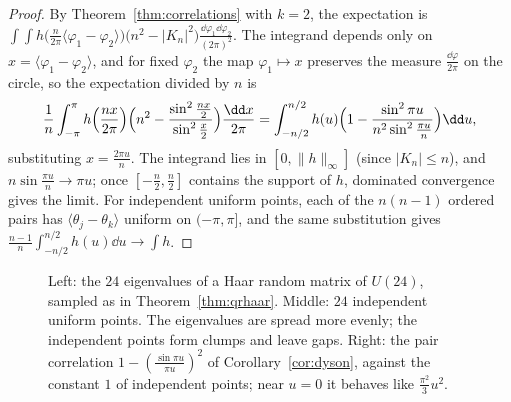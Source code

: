 \begin{proof}
By Theorem~\ref{thm:correlations} with $k=2$, the expectation is $\int\!\!\int h\bigl(\frac n{2\pi}\langle\varphi_1-\varphi_2\rangle\bigr)\bigl(n^2-|K_n|^2\bigr)\frac{\dd\varphi_1\dd\varphi_2}{(2\pi)^2}$. The integrand depends only on
$x=\langle\varphi_1-\varphi_2\rangle$, and for fixed $\varphi_2$ the map $\varphi_1\mapsto x$ preserves the measure $\frac{\dd\varphi}{2\pi}$ on the circle, so the expectation divided by $n$ is
\[\frac1n\int_{-\pi}^{\pi}h\Bigl(\frac{nx}{2\pi}\Bigr)\Bigl(n^2-\frac{\sin^2\frac{nx}2}{\sin^2\frac x2}\Bigr)\frac{\dd x}{2\pi}=\int_{-n/2}^{n/2}h(u)\Bigl(1-\frac{\sin^2\pi u}{n^2\sin^2\frac{\pi u}n}\Bigr)\dd u,\]
substituting $x=\frac{2\pi u}n$. The integrand lies in $[0,\|h\|_\infty]$ (since $|K_n|\le n$), and $n\sin\frac{\pi u}n\to\pi u$; once $[-\frac n2,\frac n2]$ contains the support of $h$, dominated convergence
gives the limit. For independent uniform points, each of the $n(n-1)$ ordered pairs has $\langle\theta_j-\theta_k\rangle$ uniform on $(-\pi,\pi]$, and the same substitution gives
$\frac{n-1}n\int_{-n/2}^{n/2}h(u)\dd u\to\int h$.
\end{proof}

\begin{figure}[ht]
\centering
{}
\caption{Left: the $24$ eigenvalues of a Haar random matrix of $U(24)$, sampled as in Theorem~\ref{thm:qrhaar}. Middle: $24$ independent uniform points. The eigenvalues are spread more
evenly; the independent points form clumps and leave gaps. Right: the pair correlation $1-(\frac{\sin\pi u}{\pi u})^2$ of Corollary~\ref{cor:dyson}, against the constant $1$ of independent points;
near $u=0$ it behaves like $\frac{\pi^2}3u^2$.}
\label{fig:cue}
\end{figure}


